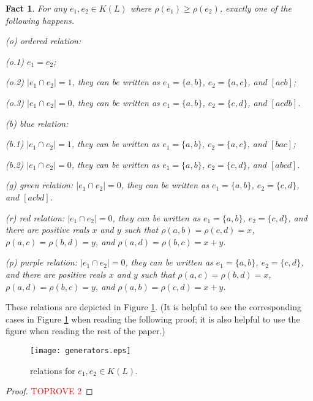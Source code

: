 \documentclass[12pt]{article}
\newtheorem{fact}{Fact}
\begin{document}
\begin{fact}\label{fact.relations}
For any $e_1, e_2 \in K(L)$ where $\rho(e_1) \ge \rho(e_2)$, exactly one of the following happens.

(o) {\em ordered relation}:

(o.1) $e_1 = e_2$;

(o.2) $|e_1 \cap e_2| = 1$, they can be written as $e_1 = \{a, b\}$, $e_2 = \{a, c\}$, and $[acb]$;

(o.3) $|e_1 \cap e_2| = 0$, they can be written as $e_1 = \{a, b\}$, $e_2 = \{c, d\}$,
and $[acdb]$.

(b) {\em blue relation}:

(b.1) $|e_1 \cap e_2| = 1$, they can be written as $e_1 = \{a, b\}$, $e_2 = \{a, c\}$,  and $[bac]$;

(b.2) $|e_1 \cap e_2| = 0$, they can be written as $e_1 = \{a, b\}$, $e_2 = \{c, d\}$,
and $[abcd]$.

(g) {\em green relation}: $|e_1 \cap e_2| = 0$, they can be written as $e_1 = \{a, b\}$, $e_2 = \{c, d\}$,
and $[acbd]$.

(r) {\em red relation}: 
$|e_1 \cap e_2| = 0$, they can be written as $e_1 = \{a, b\}$, $e_2 = \{c, d\}$, 
and there are positive reals $x$ and $y$
such that 
$\rho(a, b) = \rho(c, d)=x$,
$\rho(a, c) = \rho(b, d) = y$, and $\rho(a, d) = \rho(b, c) = x+y$.

(p) {\em purple relation}:
$|e_1 \cap e_2| = 0$, they can be written as $e_1 = \{a, b\}$, $e_2 = \{c, d\}$, 
and there are positive reals $x$ and $y$
such that 
$\rho(a, c) = \rho(b, d)=x$,
$\rho(a, d) = \rho(b, c)=y$, and $\rho(a, b) = \rho(c, d) = x+y$.
\end{fact}

These relations are depicted in Figure \ref{fig.relations}.
(It is helpful to see the corresponding cases in
Figure \ref{fig.relations} when reading the following proof;
it is also helpful to use the figure when reading the rest of the paper.)
 
\begin{figure}[h!]
\begin{center}
\texttt{[image: generators.eps]}
\caption{relations for $e_1, e_2 \in K(L)$.}
\label{fig.relations}
\end{center}
\end{figure}

\begin{proof}\textcolor{red}{TOPROVE 2}\end{proof}
\end{document}

